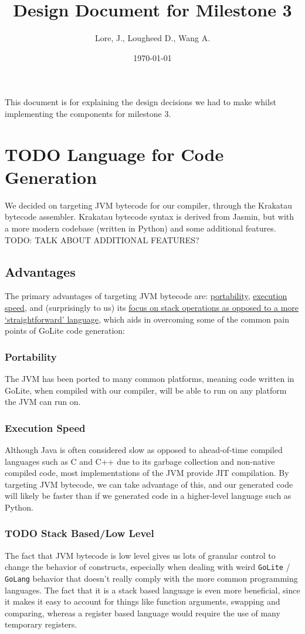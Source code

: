 \documentclass[11pt]{article}
\author{Lore, J., Lougheed D., Wang A.}
\date{\today}
\title{Design Document for Milestone 3}
\begin{document}
\maketitle
\tableofcontents

This document is for explaining the design decisions we had to make
whilst implementing the components for milestone 3.  \newpage
\section{{\bfseries\sffamily TODO} Language for Code Generation}
\label{sec:org90f4fbd}
We decided on targeting JVM bytecode for our compiler, through the Krakatau
bytecode assembler. Krakatau bytecode syntax is derived from Jasmin, but with
a more modern codebase (written in Python) and some additional features.
TODO: TALK ABOUT ADDITIONAL FEATURES?
\subsection{Advantages}
\label{sec:orgbfbb25b}
The primary advantages of targeting JVM bytecode are:
\hyperref[sec:orge2f0872]{portability}, \hyperref[sec:orgc4babf2]{execution speed},
and (surprisingly to us) its \hyperref[sec:orgeae0f3d]{focus on stack
operations as opposed to a more `straightforward' language}, which
aids in overcoming some of the common pain points of GoLite code
generation:
\subsubsection{Portability}
\label{sec:orge2f0872}
The JVM has been ported to many common platforms, meaning code written in
GoLite, when compiled with our compiler, will be able to run on any
platform the JVM can run on.
\subsubsection{Execution Speed}
\label{sec:orgc4babf2}
Although Java is often considered slow as opposed to ahead-of-time compiled
languages such as C and C++ due to its garbage collection and non-native
compiled code, most implementations of the JVM provide JIT compilation.
By targeting JVM bytecode, we can take advantage of this, and our generated
code will likely be faster than if we generated code in a higher-level
language such as Python.
\subsubsection{{\bfseries\sffamily TODO} Stack Based/Low Level}
\label{sec:orgeae0f3d}
The fact that JVM bytecode is low level gives us lots of granular
control to change the behavior of constructs, especially when
dealing with weird \texttt{GoLite} / \texttt{GoLang} behavior that doesn't
really comply with the more common programming languages. The fact
that it is a stack based language is even more beneficial, since
it makes it easy to account for things like function arguments,
swapping and comparing, whereas a register based language would
require the use of many temporary registers.
\end{document}
